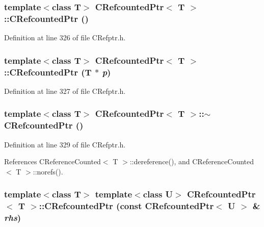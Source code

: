 \subsubsection{\setlength{\rightskip}{0pt plus 5cm}template$<$class T$>$ CRefcounted\-Ptr$<$ T $>$::CRefcounted\-Ptr ()\hspace{0.3cm}{\tt  [inline]}}\label{classCRefcountedPtr_a0}




Definition at line 326 of file CRefptr.h.
\subsubsection{\setlength{\rightskip}{0pt plus 5cm}template$<$class T$>$ CRefcounted\-Ptr$<$ T $>$::CRefcounted\-Ptr (T $\ast$ {\em p})\hspace{0.3cm}{\tt  [inline]}}\label{classCRefcountedPtr_a1}




Definition at line 327 of file CRefptr.h.
\subsubsection{\setlength{\rightskip}{0pt plus 5cm}template$<$class T$>$ CRefcounted\-Ptr$<$ T $>$::$\sim$CRefcounted\-Ptr ()\hspace{0.3cm}{\tt  [inline]}}\label{classCRefcountedPtr_a2}




Definition at line 329 of file CRefptr.h.

References CReference\-Counted$<$ T $>$::dereference(), and CReference\-Counted$<$ T $>$::norefs().
\subsubsection{\setlength{\rightskip}{0pt plus 5cm}template$<$class T$>$ template$<$class U$>$ CRefcounted\-Ptr$<$ T $>$::CRefcounted\-Ptr (const CRefcounted\-Ptr$<$ U $>$ \& {\em rhs})\hspace{0.3cm}{\tt  [inline]}}\label{classCRefcountedPtr_a3}




